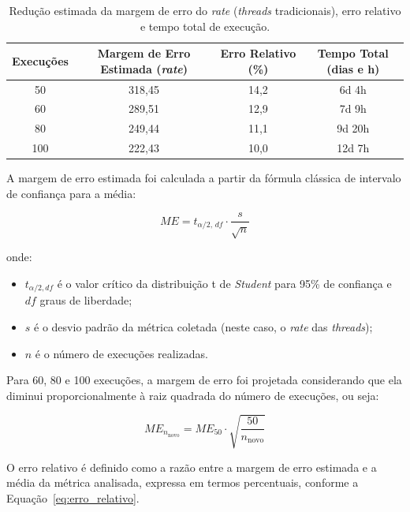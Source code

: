 \documentclass[12pt, openright, oneside, a4paper, english,	french,	spanish, brazil	]{abntex2}
\begin{document}
    \begin{table}[H]
        \centering
        \caption{\footnotesize Redução estimada da margem de erro do \textit{rate} (\textit{threads} tradicionais), erro relativo e tempo total de execução.}
        \label{tab:rate_tradicional}
        \footnotesize
        \begin{tabular}{cccc}
            \toprule
            \textbf{Execuções} &
            \textbf{Margem de Erro Estimada (\textit{rate})} &
            \textbf{Erro Relativo (\%)} &
            \textbf{Tempo Total (dias e h)} \\
            \midrule
            50  & 318,45 & 14,2 & 6d 4h  \\
            60  & 289,51 & 12,9 & 7d 9h  \\
            80  & 249,44 & 11,1 & 9d 20h \\
            100 & 222,43 & 10,0 & 12d 7h \\
            \bottomrule
        \end{tabular}
    \end{table}



    A margem de erro estimada foi calculada a partir da fórmula clássica de intervalo de confiança para a média:

    \[
        ME = t_{\alpha/2, \, df} \cdot \frac{s}{\sqrt{n}}
    \]

    onde:  
    \begin{itemize}
        \item $t_{\alpha/2, df}$ é o valor crítico da distribuição t de \textit{Student} para 95\% de confiança e $df$ graus de liberdade;
        \item $s$ é o desvio padrão da métrica coletada (neste caso, o \textit{rate} das \textit{threads});
        \item $n$ é o número de execuções realizadas.
    \end{itemize}


    Para 60, 80 e 100 execuções, a margem de erro foi projetada considerando que ela diminui proporcionalmente à raiz quadrada do número de execuções, ou seja:

    \[
        ME_{n_\text{novo}} = ME_{50} \cdot \sqrt{\frac{50}{n_\text{novo}}}
    \]

    O erro relativo é definido como a razão entre a margem de erro estimada e a média da métrica analisada, expressa em termos percentuais, conforme a Equação~\ref{eq:erro_relativo}.
\end{document}

